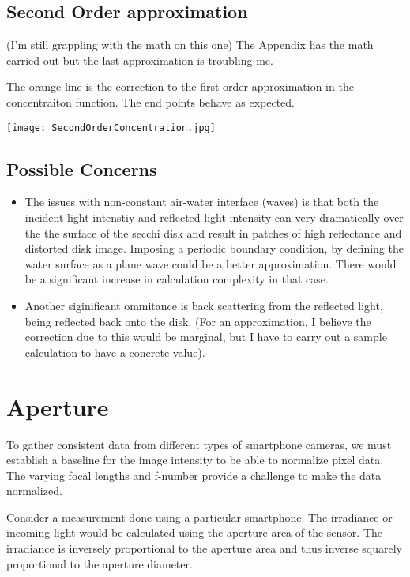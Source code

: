\documentclass{article}
\begin{document}
\subsection{Second Order approximation}
(I'm still grappling with the math on this one)
The Appendix has the math carried out but the last approximation is troubling me.

The orange line is the correction to the first order approximation in the concentraiton
function. The end points behave as expected.
\begin{center}
\texttt{[image: SecondOrderConcentration.jpg]}
\end{center}

\subsection{Possible Concerns}

\begin{itemize}
  \item The issues with non-constant air-water interface (waves) is that both the incident
  light intenstiy and reflected light intensity can very dramatically over the the
  surface of the secchi disk and result in patches of high reflectance and distorted disk
  image. Imposing a periodic boundary condition, by defining the water surface as a plane
  wave could be a better approximation. There would be a significant increase in calculation
  complexity in that case.
  \item Another siginificant ommitance is back scattering from the reflected light, being reflected
  back onto the disk. (For an approximation, I believe the correction due to this would be
  marginal, but I have to carry out a sample calculation to have a concrete value).
\end{itemize}
\section{Aperture}

To gather consistent data from different types of smartphone cameras, we must establish
a baseline for the image intensity to be able to normalize pixel data. The varying focal lengths and
f-number provide a challenge to make the data normalized.

Consider a measurement done using a particular smartphone. The irradiance
or incoming light would be calculated using the aperture area of the sensor.
The irradiance is inversely proportional to the aperture area and thus inverse
squarely proportional to the aperture diameter.
\end{document}
